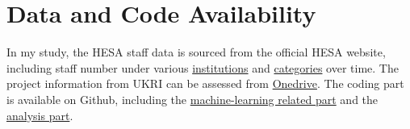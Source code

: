 \section{Data and Code Availability}

In my study, the HESA staff data is sourced from the official HESA website, including staff number under various \href{https://www.hesa.ac.uk/data-and-analysis/staff/working-in-he/characteristics}{institutions} and \href{https://www.hesa.ac.uk/data-and-analysis/staff/areas#sex}{categories} over time. The project information from UKRI can be assessed from  \href{https://imperiallondon-my.sharepoint.com/personal/fcb5018_ic_ac_uk/_layouts/15/onedrive.aspx?id=\%2Fpersonal\%2Ffcb5018\%5Fic\%5Fac\%5Fuk\%2FDocuments\%2FFunding\%2DLandscape}{Onedrive}. The coding part is available on Github, including the \href{https://github.com/FCBT/Funding-Landscape}{machine-learning related part} and the \href{https://github.com/XW1722/Project}{analysis part}.